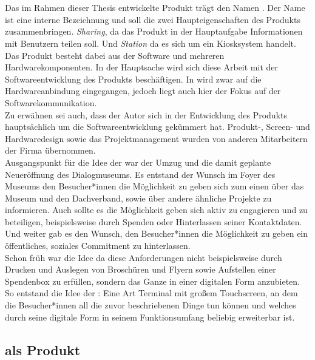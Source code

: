 \section{\shst{}}
\label{sec:sharing-station}

Das im Rahmen dieser Thesis entwickelte Produkt trägt den Namen \shst{}. Der Name 
ist eine interne Bezeichnung und soll die zwei Haupteigenschaften des Produkts zusammenbringen.
\emph{Sharing}, da das Produkt in der Hauptaufgabe Informationen mit Benutzern teilen soll. 
Und \emph{Station} da es sich um ein Kiosksystem handelt.\\

Das Produkt besteht dabei aus der Software und mehreren Hardwarekomponenten. In der Hauptsache
wird sich diese Arbeit mit der Softwareentwicklung des Produkts beschäftigen. In  wird zwar
auf die Hardwareanbindung eingegangen, jedoch liegt auch hier der Fokus auf der Softwarekommunikation.\\
Zu erwähnen sei auch, dass der Autor sich in der Entwicklung des Produkts hauptsächlich um die Softwareentwicklung 
gekümmert hat. Produkt-, Screen- und Hardwaredesign sowie das Projektmanagement wurden von anderen Mitarbeitern
der Firma \meso{} übernommen.\\

Ausgangspunkt für die Idee der \shst{} war der Umzug und die damit geplante Neueröffnung des Dialogmuseums.
Es entstand der Wunsch im Foyer des Museums den Besucher*innen die Möglichkeit zu geben sich zum einen 
über das Museum und den Dachverband, sowie über andere ähnliche Projekte zu informieren. Auch sollte
es die Möglichkeit geben sich aktiv zu engagieren und zu beteiligen, beispielsweise durch Spenden oder 
Hinterlassen seiner Kontaktdaten. Und weiter gab es den Wunsch, den Besucher*innen die Möglichkeit zu geben ein 
öffentliches, soziales Commitment zu hinterlassen.\\
Schon früh war die Idee da diese Anforderungen nicht beispielsweise durch Drucken und Auslegen von 
Broschüren und Flyern sowie Aufstellen einer Spendenbox zu erfüllen, sondern das Ganze in einer digitalen
Form anzubieten. So entstand die Idee der \shst{}: Eine Art Terminal mit großem Touchscreen, an dem die Besucher*innen 
all die zuvor beschriebenen Dinge tun können und welches durch seine digitale Form in seinem Funktionsumfang
beliebig erweiterbar ist.

\subsection{\shst{} als Produkt}
\label{subsection:sharing-station-produkt}

